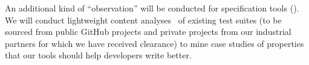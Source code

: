 
An additional kind of ``observation'' will be conducted for specification tools
(). We will conduct lightweight content
analyses~\cite{ref:krippendorff2018content} of existing test suites (to be
sourced from public GitHub projects and private projects from our industrial
partners for which we have received clearance) to mine case studies of
properties that our tools should help developers write better.



